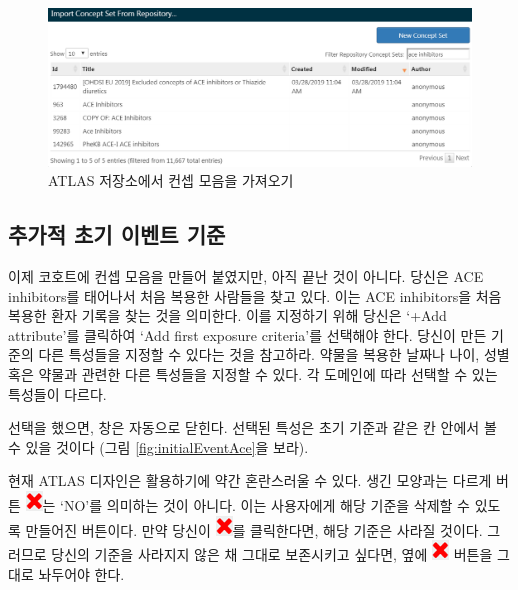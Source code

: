 \documentclass[11pt]{book}
\theoremstyle{definition}
\theoremstyle{definition}
\theoremstyle{definition}
\theoremstyle{remark}
\let\BeginKnitrBlock\begin \let\EndKnitrBlock\end
\begin{document}
\begin{figure}

{\centering \includegraphics[width=1\linewidth]{images/Cohorts/ATLAS-findingyourconcept} 

}

\caption{ATLAS 저장소에서 컨셉 모음을 가져오기}\label{fig:ATLASfindyourconcept}
\end{figure}

\subsection{추가적 초기 이벤트 기준}\label{---}

이제 코호트에 컨셉 모음을 만들어 붙였지만, 아직 끝난 것이 아니다. 당신은
ACE inhibitors를 태어나서 처음 복용한 사람들을 찾고 있다. 이는 ACE
inhibitors을 처음 복용한 환자 기록을 찾는 것을 의미한다. 이를 지정하기
위해 당신은 `+Add attribute'를 클릭하여 `Add first exposure criteria'를
선택해야 한다. 당신이 만든 기준의 다른 특성들을 지정할 수 있다는 것을
참고하라. 약물을 복용한 날짜나 나이, 성별 혹은 약물과 관련한 다른
특성들을 지정할 수 있다. 각 도메인에 따라 선택할 수 있는 특성들이
다르다.

선택을 했으면, 창은 자동으로 닫힌다. 선택된 특성은 초기 기준과 같은 칸
안에서 볼 수 있을 것이다 (그림 \ref{fig:initialEventAce}을 보라).

\BeginKnitrBlock{rmdimportant}
현재 ATLAS 디자인은 활용하기에 약간 혼란스러울 수 있다. 생긴 모양과는
다르게 버튼 \includegraphics{images/Cohorts/redX.png}는 `NO'를 의미하는
것이 아니다. 이는 사용자에게 해당 기준을 삭제할 수 있도록 만들어진
버튼이다. 만약 당신이 \includegraphics{images/Cohorts/redX.png}를
클릭한다면, 해당 기준은 사라질 것이다. 그러므로 당신의 기준을 사라지지
않은 채 그대로 보존시키고 싶다면, 옆에
\includegraphics{images/Cohorts/redX.png} 버튼을 그대로 놔두어야 한다.
\EndKnitrBlock{rmdimportant}
\end{document}
